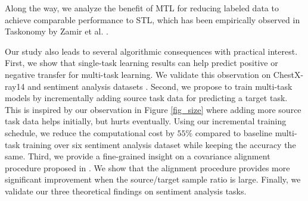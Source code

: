 Along the way, we analyze the benefit of MTL for reducing labeled data to achieve comparable performance to STL, which has been empirically observed in Taskonomy by Zamir et al. \cite{ZSSGM18}.

Our study also leads to several algorithmic consequences with practical interest.
First, we show that single-task learning results can help predict positive or negative transfer for multi-task learning.
We validate this observation on ChestX-ray14 \cite{chexnet17} and sentiment analysis datasets \cite{LZWDA18}.
Second, we propose to train multi-task models by incrementally adding source task data for predicting a target task.
This is inspired by our observation in Figure \ref{fig_size} where adding more source task data helps initially, but hurts eventually.
Using our incremental training schedule, we reduce the computational cost by $55\%$ compared to baseline multi-task training over six sentiment analysis dataset while keeping the accuracy the same.
Third, we provide a fine-grained insight on a covariance alignment procedure proposed in \cite{WZR20}.
We show that the alignment procedure provides more significant improvement when the source/target sample ratio is large.
Finally, we validate our three theoretical findings on sentiment analysis tasks.
